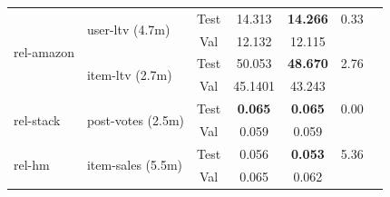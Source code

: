 \begin{table}[ht]
\begin{minipage}{.49\textwidth}
{\begin{tabular}{llccccc}
\midrule
\multirow{4}{*}{rel-amazon}
 & \multirow{2}{*}{user-ltv (4.7m)} & Test & 14.313 & \textbf{14.266} & 0.33 \\
 & & Val & 12.132 & 12.115 & \\
 & \multirow{2}{*}{item-ltv (2.7m)} & Test & 50.053 & \textbf{48.670} & 2.76 \\
 & & Val & 45.1401 & 43.243 &  \\

\midrule
\multirow{2}{*}{rel-stack}
 & \multirow{2}{*}{post-votes (2.5m)} & Test & \textbf{0.065} & \textbf{0.065} & 0.00 \\
 & & Val & 0.059 & 0.059 & \\

\midrule
\multirow{2}{*}{rel-hm}
 & \multirow{2}{*}{item-sales (5.5m)} & Test & 0.056 & \textbf{0.053} & 5.36 \\
 & & Val & 0.065 & 0.062 & \\

\bottomrule
\end{tabular}
}
\end{minipage}
\end{table}









